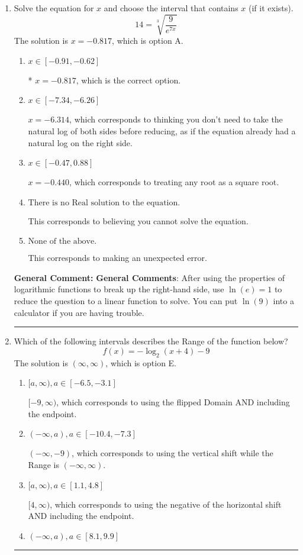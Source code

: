 \documentclass{extbook}[14pt]
\newcommand{\litem}[1]{\item #1

\rule{\textwidth}{0.4pt}}
\begin{document}
\begin{enumerate}\litem{
 Solve the equation for $x$ and choose the interval that contains $x$ (if it exists).
\[  14 = \sqrt[3]{\frac{9}{e^{7x}}} \]The solution is \( x = -0.817 \), which is option A.\begin{enumerate}[label=\Alph*.]
\item \( x \in [-0.91, -0.62] \)

* $x = -0.817$, which is the correct option.
\item \( x \in [-7.34, -6.26] \)

$x = -6.314$, which corresponds to thinking you don't need to take the natural log of both sides before reducing, as if the equation already had a natural log on the right side.
\item \( x \in [-0.47, 0.88] \)

$x = -0.440$, which corresponds to treating any root as a square root.
\item \( \text{There is no Real solution to the equation.} \)

This corresponds to believing you cannot solve the equation.
\item \( \text{None of the above.} \)

This corresponds to making an unexpected error.
\end{enumerate}

\textbf{General Comment:} \textbf{General Comments}: After using the properties of logarithmic functions to break up the right-hand side, use $\ln(e) = 1$ to reduce the question to a linear function to solve. You can put $\ln(9)$ into a calculator if you are having trouble.
}
\litem{
Which of the following intervals describes the Range of the function below?
\[ f(x) = -\log_2{(x+4)}-9 \]The solution is \( (\infty, \infty) \), which is option E.\begin{enumerate}[label=\Alph*.]
\item \( [a, \infty), a \in [-6.5, -3.1] \)

$[-9, \infty)$, which corresponds to using the flipped Domain AND including the endpoint.
\item \( (-\infty, a), a \in [-10.4, -7.3] \)

$(-\infty, -9)$, which corresponds to using the vertical shift while the Range is $(-\infty, \infty)$.
\item \( [a, \infty), a \in [1.1, 4.8] \)

$[4, \infty)$, which corresponds to using the negative of the horizontal shift AND including the endpoint.
\item \( (-\infty, a), a \in [8.1, 9.9] \)


\end{enumerate}}
\end{enumerate}
\end{document}
